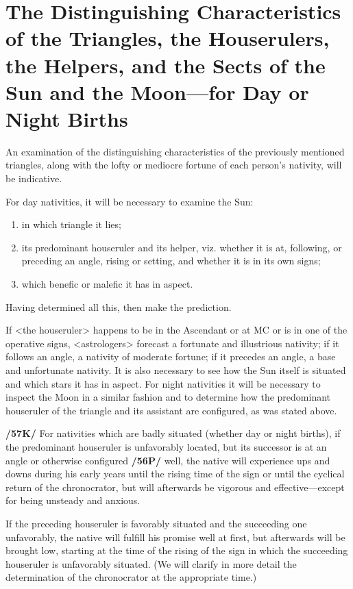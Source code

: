 \section{The Distinguishing Characteristics of the Triangles, the Houserulers, the Helpers, and the Sects of the Sun and the Moon—for Day or Night Births}

An examination of the distinguishing characteristics of the previously mentioned triangles, along with the lofty or mediocre fortune of each person’s nativity, will be indicative. 

\mnm[0.3cm]
For day nativities, it will be necessary to examine the Sun: 
\begin{enumerate}
\item in which triangle it lies;
\item its predominant houseruler and its helper, viz. whether it is at, following, or preceding an angle, rising or setting, and whether it is in its own signs;
\item which benefic or malefic it has in aspect. 
\end{enumerate}
Having determined all this, then make the prediction. 

\mndl[0.2cm]
If <the houseruler> happens to be in the Ascendant or at MC or is in one of the operative signs, <astrologers> forecast a fortunate and illustrious nativity; if it follows an angle, a nativity of moderate fortune; if it precedes an angle, a base and unfortunate nativity. It is also necessary to see how the Sun itself is situated and which stars it has in aspect. For night nativities it will be necessary to inspect the Moon in a similar fashion and to determine how the predominant houseruler of the triangle and its assistant are configured, as was stated above.

\textbf{/57K/} For nativities which are badly situated (whether day or night births), if the predominant
houseruler is unfavorably located, but its successor is at an angle or otherwise configured \textbf{/56P/} well, the
native will experience ups and downs during his early years until the rising time of the sign or until the cyclical return of the chronocrator, but will afterwards be vigorous and effective—except for being unsteady and anxious. 

If the preceding houseruler is favorably situated and the succeeding one unfavorably, the native will fulfill his promise well at first, but afterwards will be brought low, starting at the time of the rising of the sign in which the succeeding houseruler is unfavorably situated. (We will clarify in more detail the determination of the chronocrator at the appropriate time.) 

